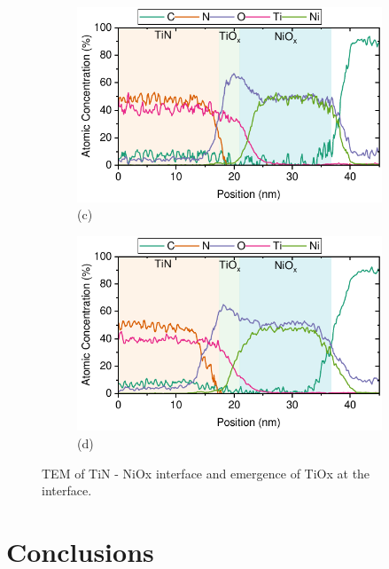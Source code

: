 \begin{figure}[htbp]
    \begin{subfigure}[t]{0.49\textwidth}
        \centering
        \includegraphics[width=\textwidth]{chapters/material_properties/images/TEM_30_min.pdf} %
        \caption*{(c)}
    \end{subfigure}
    \hfill
    \begin{subfigure}[t]{0.49\textwidth}
        \centering
        \includegraphics[width=\textwidth]{chapters/material_properties/images/TEM_60_min.pdf} %
        \caption*{(d)}
    \end{subfigure}
    \caption{TEM of TiN - NiOx interface and emergence of TiOx at the interface.}
    \label{fig:ch2:tem_pix_substrate}
\end{figure}


\section{Conclusions}



\cleardoublepage

